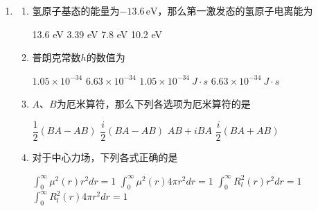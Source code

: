 

\begin{enumerate}
	\item
\begin{enumerate}
	\item
氢原子基态的能量为$-13.6\,\mathrm{eV}$，那么第一激发态的氢原子电离能为  

\fourchoices
{13.6 eV}
{3.39 eV}
{7.8 eV}
{10.2 eV}


\item 
普朗克常数$h$的数值为  

\fourchoices
{$1.05\times10^{-34} $}
{$6.63\times10^{-34}  $}
{$1.05\times10^{-34} \ J \cdot s  $}
{$6.63\times10^{-34} \ J \cdot s $}

\item 
$ A $、$ B $为厄米算符，那么下列各选项为厄米算符的是  

\fourchoices
{$\dfrac{1}{2}(BA-AB) $}
{$\dfrac{i}{2}(BA-AB) $}
{$AB+iBA $}
{$\dfrac{i}{2}(BA+AB)$}

\item 
对于中心力场，下列各式正确的是  


\fourchoices
{$\int_{0}^{\infty} \mu^{2}(r) r^{2} d r=1$}
{$ \int_{0}^{\infty} \mu^{2} (r) 4 \pi r^{2} d r=1$}
{$\int_{0}^{\infty} R_{l}^{2}(r) r^{2} d r=1$}
{$\int_{0}^{\infty} R_{l}^{2}(r) 4 \pi r^{2} d r=1$}





\end{enumerate}
\end{enumerate}
